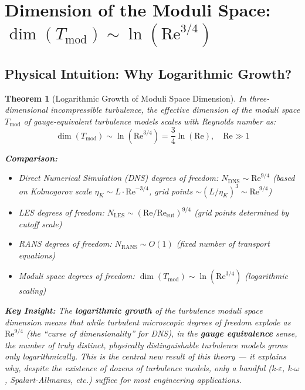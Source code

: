 \documentclass[12pt,a4paper]{article}
\theoremstyle{plain}
\newtheorem{theorem}{Theorem}[section]
\theoremstyle{definition}
\theoremstyle{remark}
\newcommand{\Tmod}{T_{\text{mod}}}
\newcommand{\ReNum}{\mathrm{Re}}
\newcommand{\eps}{\varepsilon}
\begin{document}
\section{Dimension of the Moduli Space: $\dim(\Tmod) \sim \ln(\ReNum^{3/4})$}

\subsection{Physical Intuition: Why Logarithmic Growth?}

\begin{theorem}[Logarithmic Growth of Moduli Space Dimension]\label{thm:dim}
In three-dimensional incompressible turbulence, the effective dimension of the moduli space $\Tmod$ of gauge-equivalent turbulence models scales with Reynolds number as:
\begin{equation}
\dim(\Tmod) \sim \ln\left(\ReNum^{3/4}\right) = \frac{3}{4}\ln(\ReNum), \quad \ReNum \gg 1
\label{eq:dim_scaling}
\end{equation}

\textbf{Comparison:}
\begin{itemize}
    \item Direct Numerical Simulation (DNS) degrees of freedom: $N_{\text{DNS}} \sim \ReNum^{9/4}$ (based on Kolmogorov scale $\eta_K \sim L\cdot\ReNum^{-3/4}$, grid points $\sim (L/\eta_K)^3 \sim \ReNum^{9/4}$)
    \item LES degrees of freedom: $N_{\text{LES}} \sim (\ReNum / \ReNum_{\text{cut}})^{9/4}$ (grid points determined by cutoff scale)
    \item RANS degrees of freedom: $N_{\text{RANS}} \sim O(1)$ (fixed number of transport equations)
    \item Moduli space degrees of freedom: $\dim(\Tmod) \sim \ln(\ReNum^{3/4})$ (logarithmic scaling)
\end{itemize}

\textbf{Key Insight:} The \textbf{logarithmic growth} of the turbulence moduli space dimension means that while turbulent microscopic degrees of freedom explode as $\ReNum^{9/4}$ (the ``curse of dimensionality'' for DNS), in the \textbf{gauge equivalence} sense, the number of truly distinct, physically distinguishable turbulence models grows only logarithmically. This is the central new result of this theory --- it explains why, despite the existence of dozens of turbulence models, only a handful (k-$\eps$, k-$\omega$, Spalart-Allmaras, etc.) suffice for most engineering applications.
\end{theorem}
\end{document}
